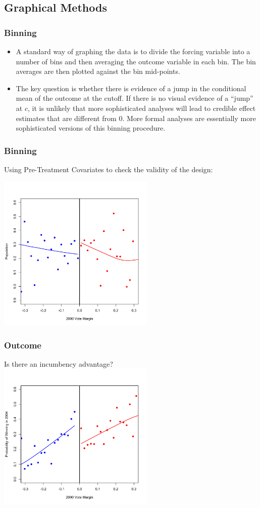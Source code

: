 \documentclass{beamer}
\begin{document}
\subsection{Graphical Methods}
\begin{frame}
  \frametitle{Binning}
  \begin{itemize}
  \item A standard way of graphing the data is to divide the forcing
    variable into a number of bins and then averaging the outcome
    variable in each bin. The bin averages are then plotted against
    the bin mid-points.
  \item The key question is whether there is evidence of a jump in the
    conditional mean of the outcome at the cutoff. If there is no
    visual evidence of a ``jump'' at $c$, it is unlikely that
    more sophisticated analyses will lead to credible effect
    estimates that are different from 0.  More formal 
    analyses are essentially more sophisticated versions of this
    binning procedure.
  \end{itemize}

\end{frame}

\begin{frame}
  \frametitle{Binning}
Using Pre-Treatment Covariates to check the validity of the design:

  \includegraphics[width=7.5cm]{population_bal_check.pdf}  

\end{frame}

\begin{frame}
  \frametitle{Outcome}
Is there an incumbency advantage? 
  \includegraphics[width=7.5cm]{PMDB_treat_effect.pdf}  

\end{frame}
\end{document}
